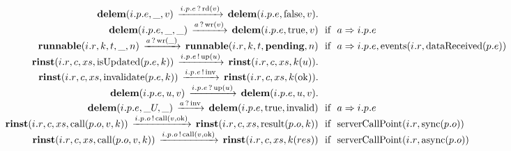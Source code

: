 \[\begin{array}{r@{}c@{}llllll}
\\\Pfact{\Tstep{\Tdelem{\Tep{\Tvar{E}}{\Tvar{P}}{\Tvar{I}}}{\_}{\Tvar{V}}}{\Thear{\Tep{\Tvar{E}}{\Tvar{P}}{\Tvar{I}}}{\Trd{\Tvar{V}}}}{\Tdelem{\Tep{\Tvar{E}}{\Tvar{P}}{\Tvar{I}}}{\Tfalse}{\Tvar{V}}}}
\\\Prule{\Tstep{\Tdelem{\Tep{\Tvar{E}}{\Tvar{P}}{\Tvar{I}}}{\_}{\_}}{\Thear{\Tvar{A}}{\Twr{\Tvar{V}}}}{\Tdelem{\Tep{\Tvar{E}}{\Tvar{P}}{\Tvar{I}}}{\Ttrue}{\Tvar{V}}}}{\Tconnect{\Tvar{A}}{\Tep{\Tvar{E}}{\Tvar{P}}{\Tvar{I}}}}
\\\Prule{\Tstep{\Trunnable{\Tr{\Tvar{R}}{\Tvar{I}}}{\Tvar{K}}{\Tvar{T}}{\_}{\Tvar{N}}}{\Thear{\Tvar{A}}{\Twr{\_}}}{\Trunnable{\Tr{\Tvar{R}}{\Tvar{I}}}{\Tvar{K}}{\Tvar{T}}{\Tpending}{\Tvar{N}}}}{\Tconnect{\Tvar{A}}{\Tep{\Tvar{E}}{\Tvar{P}}{\Tvar{I}}},\Tevents{\Tr{\Tvar{R}}{\Tvar{I}}}{\TdataReceived{\Te{\Tvar{E}}{\Tvar{P}}}}}
\\\Pfact{\Tstep{\Trinst{\Tr{\Tvar{R}}{\Tvar{I}}}{\Tvar{C}}{\Tvar{Xs}}{\TrteIsUpdated{\Te{\Tvar{E}}{\Tvar{P}}}{\Tvar{K}}}}{\Tsay{\Tep{\Tvar{E}}{\Tvar{P}}{\Tvar{I}}}{\Tup{\Tvar{U}}}}{\Trinst{\Tr{\Tvar{R}}{\Tvar{I}}}{\Tvar{C}}{\Tvar{Xs}}{\Tap{\Tvar{K}}{\Tvar{U}}}}}
\\\Pfact{\Tstep{\Trinst{\Tr{\Tvar{R}}{\Tvar{I}}}{\Tvar{C}}{\Tvar{Xs}}{\TrteInvalidate{\Te{\Tvar{E}}{\Tvar{P}}}{\Tvar{K}}}}{\Tsay{\Tep{\Tvar{E}}{\Tvar{P}}{\Tvar{I}}}{\Tinv}}{\Trinst{\Tr{\Tvar{R}}{\Tvar{I}}}{\Tvar{C}}{\Tvar{Xs}}{\Tap{\Tvar{K}}{\Tok}}}}
\\\Pfact{\Tstep{\Tdelem{\Tep{\Tvar{E}}{\Tvar{P}}{\Tvar{I}}}{\Tvar{U}}{\Tvar{V}}}{\Thear{\Tep{\Tvar{E}}{\Tvar{P}}{\Tvar{I}}}{\Tup{\Tvar{U}}}}{\Tdelem{\Tep{\Tvar{E}}{\Tvar{P}}{\Tvar{I}}}{\Tvar{U}}{\Tvar{V}}}}
\\\Prule{\Tstep{\Tdelem{\Tep{\Tvar{E}}{\Tvar{P}}{\Tvar{I}}}{\_U}{\_}}{\Thear{\Tvar{A}}{\Tinv}}{\Tdelem{\Tep{\Tvar{E}}{\Tvar{P}}{\Tvar{I}}}{\Ttrue}{\Tinvalid}}}{\Tconnect{\Tvar{A}}{\Tep{\Tvar{E}}{\Tvar{P}}{\Tvar{I}}}}
\\\Prule{\Tstep{\Trinst{\Tr{\Tvar{R}}{\Tvar{I}}}{\Tvar{C}}{\Tvar{Xs}}{\TrteCall{\To{\Tvar{O}}{\Tvar{P}}}{\Tvar{V}}{\Tvar{K}}}}{\Tsay{\Top{\Tvar{O}}{\Tvar{P}}{\Tvar{I}}}{\Tcall{\Tvar{V}}{\Tok}}}{\Trinst{\Tr{\Tvar{R}}{\Tvar{I}}}{\Tvar{C}}{\Tvar{Xs}}{\TrteResult{\To{\Tvar{O}}{\Tvar{P}}}{\Tvar{K}}}}}{\TserverCallPoint{\Tr{\Tvar{R}}{\Tvar{I}}}{\Tsync{\To{\Tvar{O}}{\Tvar{P}}}}}
\\\Prule{\Tstep{\Trinst{\Tr{\Tvar{R}}{\Tvar{I}}}{\Tvar{C}}{\Tvar{Xs}}{\TrteCall{\To{\Tvar{O}}{\Tvar{P}}}{\Tvar{V}}{\Tvar{K}}}}{\Tsay{\Top{\Tvar{O}}{\Tvar{P}}{\Tvar{I}}}{\Tcall{\Tvar{V}}{\Tok}}}{\Trinst{\Tr{\Tvar{R}}{\Tvar{I}}}{\Tvar{C}}{\Tvar{Xs}}{\Tap{\Tvar{K}}{\Tvar{Res}}}}}{\TserverCallPoint{\Tr{\Tvar{R}}{\Tvar{I}}}{\Tasync{\To{\Tvar{O}}{\Tvar{P}}}}}

\end{array}\]
